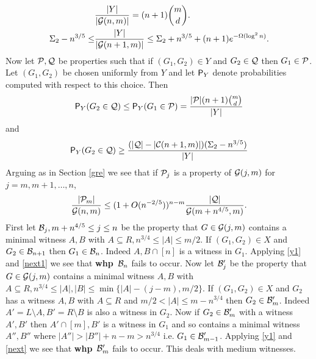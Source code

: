\documentclass[11pt]{article}
\def\cP{{\cal P}}
\def\S{\Sigma}
\def\whp{{\bf whp}}
\def\Pr{{\sf P}}
\def\cC{{\cal C}}
\def\cB{{\cal B}}
\def\cG{{\cal G}}
\def\cQ{{\cal Q}}
\newcommand{\beq}[1]{\begin{equation}\label{#1}}
\newcommand{\eeq}{\end{equation}}
\def\c{{3/4}}
\begin{document}
\begin{align*}
&\frac{|Y|}{|\cG(n,m)|}= (n+1)\binom{m}{d}.\\
\S_2-n^{3/5}\leq &\frac{|Y|}{|\cG(n+1,m)|}\leq \S_2+n^{3/5}+(n+1)e^{-\Omega(\log^2n)}.
\end{align*}
Now let $\cP,\cQ$ be properties such that if $(G_1,G_2)\in Y$ and $G_2\in\cQ$ then $G_1\in\cP$. Let $(G_1,G_2)$
be chosen uniformly from $Y$ and let $\Pr_Y$ denote probabilities computed with respect to this choice. Then
$$\Pr_Y(G_2\in\cQ)\leq \Pr_Y(G_1\in\cP)= \frac{|\cP|(n+1)\binom{m}{d}}{|Y|}$$
and
$$\Pr_Y(G_2\in\cQ)\geq \frac{(|\cQ|-|\cC(n+1,m)|)(\S_2-n^{3/5})}{|Y|}$$
Arguing as in Section \ref{gre} we see that if
$\cP_j$ is a property of $\cG(j,m)$ for $j=m,m+1,\ldots,n$, 
\beq{y1}
\frac{|\cP_m|}{\cG(n,m)}\leq (1+O(n^{-2/5}))^{n-m}\frac{|\cQ|}{\cG(m+n^{4/5},m)}.
\eeq
First let $\cB_j,m+n^{4/5}\leq j\leq n$ be 
the property that $G\in \cG(j,m)$ contains a minimal witness $A,B$ with $A\subseteq R,n^\c\leq |A|\leq m/2$.
If $(G_1,G_2)\in X$ and $G_2\in\cB_{n+1}$ then $G_1\in\cB_n$. 
Indeed $A,B\cap[n]$ is a witness in $G_1$.
Applying \eqref{y1} and \eqref{next1} we see that 
\whp\ $\cB_n$ fails to occur. 
Now let $\cB_j'$ be the property that $G\in \cG(j,m)$ contains a minimal
witness $A,B$ with $A\subseteq R,n^\c\leq |A|,|B|\leq \min\{|A|-(j-m),m/2\}$.
If $(G_1,G_2)\in X$ and $G_2$ has a 
witness $A,B$ with $A\subseteq R$ and $m/2< |A|\leq m-n^\c$ 
then $G_2\in\cB'_m$. Indeed $A'=L\setminus A,B'=R\setminus B$ is 
also a witness in $G_2$. Now if $G_2\in\cB'_m$ with a witness
$A',B'$ then $A'\cap[m],B'$ is a witness in $G_1$ and so contains 
a minimal witness $A'',B''$ where 
$|A''|>|B''|+n-m>n^\c$ i.e. $G_1\in \cB_{m-1}'$.
Applying \eqref{y1} and \eqref{next} we see that 
\whp\ $\cB_m'$ fails to occur. 
This deals with medium witnesses.
\end{document}

